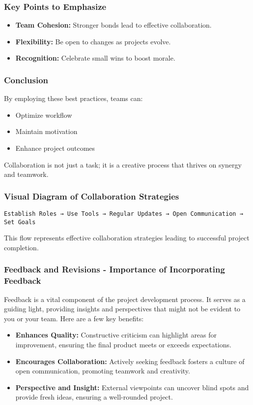 \documentclass[aspectratio=169]{beamer}
\begin{document}
\begin{frame}[fragile]
    \frametitle{Key Points to Emphasize}
    \begin{itemize}
        \item \textbf{Team Cohesion:} Stronger bonds lead to effective collaboration.
        \item \textbf{Flexibility:} Be open to changes as projects evolve.
        \item \textbf{Recognition:} Celebrate small wins to boost morale.
    \end{itemize}
\end{frame}

\begin{frame}[fragile]
    \frametitle{Conclusion}
    By employing these best practices, teams can:
    \begin{itemize}
        \item Optimize workflow
        \item Maintain motivation
        \item Enhance project outcomes
    \end{itemize}
    Collaboration is not just a task; it is a creative process that thrives on synergy and teamwork.
\end{frame}

\begin{frame}[fragile]
    \frametitle{Visual Diagram of Collaboration Strategies}
    \begin{center}
        \texttt{Establish Roles → Use Tools → Regular Updates → Open Communication → Set Goals}
    \end{center}
    This flow represents effective collaboration strategies leading to successful project completion.
\end{frame}

\begin{frame}[fragile]
    \frametitle{Feedback and Revisions - Importance of Incorporating Feedback}
    Feedback is a vital component of the project development process. It serves as a guiding light, providing insights and perspectives that might not be evident to you or your team. Here are a few key benefits:
    
    \begin{itemize}
        \item \textbf{Enhances Quality:} Constructive criticism can highlight areas for improvement, ensuring the final product meets or exceeds expectations.
        \item \textbf{Encourages Collaboration:} Actively seeking feedback fosters a culture of open communication, promoting teamwork and creativity.
        \item \textbf{Perspective and Insight:} External viewpoints can uncover blind spots and provide fresh ideas, ensuring a well-rounded project.
    \end{itemize}
\end{frame}
\end{document}
